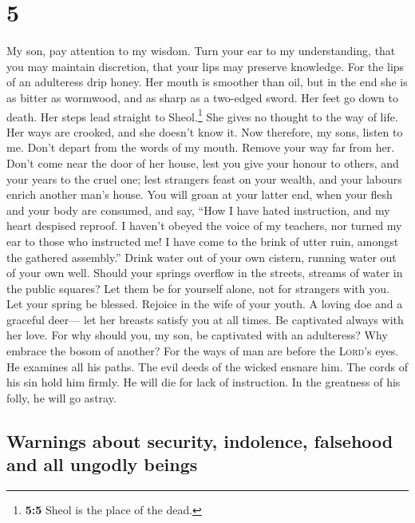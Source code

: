 \hypertarget{section-4}{%
\section{5}\label{section-4}}

 My son, pay attention to my wisdom. Turn your ear to my
understanding,  that you may maintain discretion, that
your lips may preserve knowledge.  For the lips of an
adulteress drip honey. Her mouth is smoother than oil, 
but in the end she is as bitter as wormwood, and as sharp as a two-edged
sword.  Her feet go down to death. Her steps lead straight
to Sheol.\footnote{\textbf{5:5} Sheol is the place of the dead.}
 She gives no thought to the way of life. Her ways are
crooked, and she doesn't know it.  Now therefore, my sons,
listen to me. Don't depart from the words of my mouth. 
Remove your way far from her. Don't come near the door of her house,
 lest you give your honour to others, and your years to
the cruel one;  lest strangers feast on your wealth, and
your labours enrich another man's house.  You will groan
at your latter end, when your flesh and your body are consumed,
 and say, ``How I have hated instruction, and my heart
despised reproof.  I haven't obeyed the voice of my
teachers, nor turned my ear to those who instructed me! 
I have come to the brink of utter ruin, amongst the gathered assembly.''
 Drink water out of your own cistern, running water out
of your own well.  Should your springs overflow in the
streets, streams of water in the public squares?  Let
them be for yourself alone, not for strangers with you. 
Let your spring be blessed. Rejoice in the wife of your youth.
 A loving doe and a graceful deer--- let her breasts
satisfy you at all times. Be captivated always with her love.
 For why should you, my son, be captivated with an
adulteress? Why embrace the bosom of another?  For the
ways of man are before the \textsc{Lord}'s eyes. He examines all his
paths.  The evil deeds of the wicked ensnare him. The
cords of his sin hold him firmly.  He will die for lack
of instruction. In the greatness of his folly, he will go astray.

\hypertarget{warnings-about-security-indolence-falsehood-and-all-ungodly-beings}{%
\subsection{Warnings about security, indolence, falsehood and all
ungodly
beings}\label{warnings-about-security-indolence-falsehood-and-all-ungodly-beings}}

